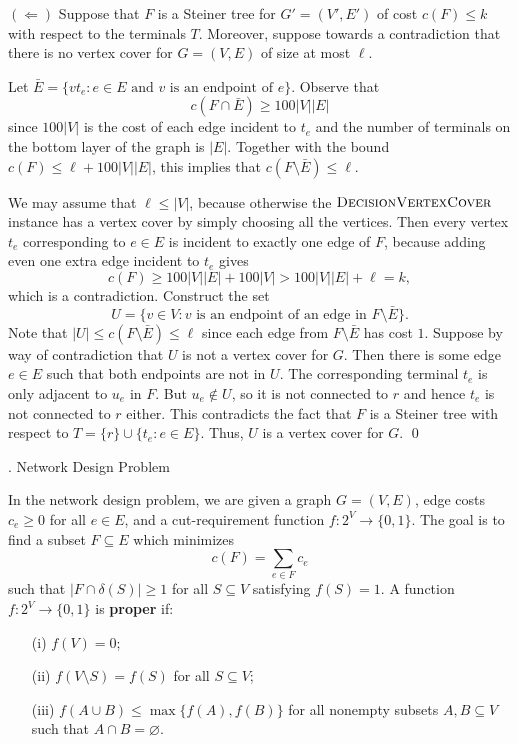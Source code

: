 \documentclass{article}
\DeclareMathOperator{\DecisionVertexCover}{\textsc{DecisionVertexCover}}
\begin{document}
{$(\Leftarrow)$ Suppose that $F$ is a Steiner tree for $G' = (V', E')$ 
of cost $c(F) \leq k$ with respect to the terminals $T$. Moreover, 
suppose towards a contradiction that there is no vertex cover 
for $G = (V, E)$ of size at most $\ell$. 

Let $\bar E = \{vt_e : e \in E \text{ and } v \text{ is an endpoint of } e\}$. 
Observe that 
\[ c(F \cap \bar E) \geq 100|V||E| \] 
since $100|V|$ is the cost of each edge incident to $t_e$ and the 
number of terminals on the bottom layer of the graph is $|E|$. Together 
with the bound $c(F) \leq \ell + 100|V||E|$, this implies that 
$c(F \setminus \bar E) \leq \ell$. 

We may assume that $\ell \leq |V|$, because otherwise the $\DecisionVertexCover$
instance has a vertex cover by simply choosing all the vertices. Then 
every vertex $t_e$ corresponding to $e \in E$ is incident to exactly 
one edge of $F$, because adding even one extra edge incident to $t_e$ gives 
\[ c(F) \geq 100|V||E| + 100|V| > 100|V||E| + \ell = k, \] 
which is a contradiction. Construct the set 
\[ U = \{v \in V : v \text{ is an endpoint of an edge in } F \setminus \bar E\}. \] 
Note that $|U| \leq c(F \setminus \bar E) \leq \ell$ since each edge 
from $F \setminus \bar E$ has cost $1$. Suppose by way of contradiction 
that $U$ is not a vertex cover for $G$. Then there is some edge 
$e \in E$ such that both endpoints are not in $U$. The 
corresponding terminal $t_e$ is only adjacent to $u_e$ in $F$. 
But $u_e \notin U$, so it is not connected to $r$ and hence 
$t_e$ is not connected to $r$ either. This contradicts the fact that 
$F$ is a Steiner tree with respect to $T = \{r\} \cup \{t_e : e \in E\}$. 
Thus, $U$ is a vertex cover for $G$. \qed 
}
\newpage 
\begin{center}
    {. Network Design Problem}
\end{center}

In the network design problem, we are given a graph $G = (V, E)$,
edge costs $c_e \geq 0$ for all $e \in E$, and a cut-requirement function 
$f : 2^V \to \{0, 1\}$. The goal is to find a subset $F \subseteq E$ 
which minimizes 
\[ c(F) = \sum_{e\in F} c_e \] 
such that $|F \cap \delta(S)| \geq 1$ for all $S \subseteq V$ satisfying 
$f(S) = 1$. A function $f : 2^V \to \{0, 1\}$ is {\bf proper} if: 
\begin{enumerate}
    \item [(i)] $f(V) = 0$; 
    \item [(ii)] $f(V \setminus S) = f(S)$ for all $S \subseteq V$; 
    \item [(iii)] $f(A \cup B) \leq \max\{f(A), f(B)\}$ for all 
    nonempty subsets $A, B \subseteq V$ such that $A \cap B = \varnothing$.
\end{enumerate}
\end{document}
